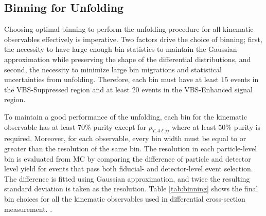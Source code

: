 \subsection{Binning for Unfolding}
\label{subsec:Binning}
Choosing optimal binning to perform the unfolding procedure for all kinematic observables effectively is imperative. Two factors drive the choice of binning; first, the necessity to have large enough bin statistics to maintain the Gaussian approximation while preserving the shape of the differential distributions, and second, the necessity to minimize large bin migrations and statistical uncertainties from unfolding. Therefore, each bin must have at least $15$ events in the VBS-Suppressed region and at least $20$ events in the VBS-Enhanced signal region. 

To maintain a good performance of the unfolding, each bin for the kinematic observable has at least $70\%$ purity except for $p_{T,4\ell jj}$ where at least $50\%$ purity is required. Moreover, for each observable, every bin width must be equal to or greater than the resolution of the same bin. The resolution in each particle-level bin is evaluated from MC by comparing the difference of particle and detector level yield for events that pass both fiducial- and detector-level event selection. The difference is fitted using Gaussian approximation, and twice the resulting standard deviation is taken as the resolution. Table \ref{tab:binning} shows the final bin choices for all the kinematic observables used in differential cross-section measurement.
.


